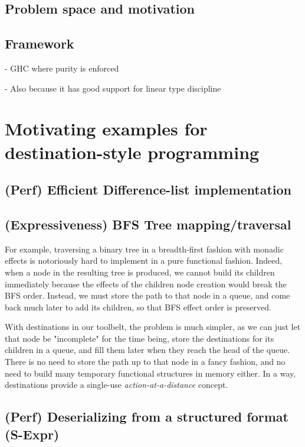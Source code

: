 \documentclass[english]{jflart}
\begin{document}
\subsection{Problem space and motivation}

\subsection{Framework}

- GHC where purity is enforced

- Also because it has good support for linear type discipline

\section{Motivating examples for destination-style programming}

\subsection{(Perf) Efficient Difference-list implementation}

\subsection{(Expressiveness) BFS Tree mapping/traversal}

For example, traversing a binary tree in a breadth-first fashion with monadic effects is notoriously hard to implement in a pure functional fashion. Indeed, when a node in the resulting tree is produced, we cannot build its children immediately because the effects of the children node creation would break the BFS order. Instead, we must store the path to that node in a queue, and come back much later to add its children, so that BFS effect order is preserved.

With destinations in our toolbelt, the problem is much simpler, as we can just let that node be "incomplete" for the time being, store the destinations for its children in a queue, and fill them later when they reach the head of the queue. There is no need to store the path up to that node in a fancy fashion, and no need to build many temporary functional structures in memory either. In a way, destinations provide a single-use \emph{action-at-a-distance} concept.

\subsection{(Perf) Deserializing from a structured format (S-Expr)}
\end{document}

